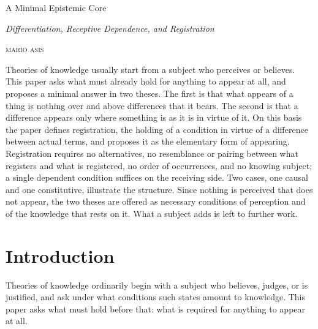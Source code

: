\documentclass[11pt,a4paper,oneside]{scrartcl}
\begin{document}
\thispagestyle{plain.scrheadings}
\begin{center}
  \vspace*{.2\baselineskip}
  {\LARGE A Minimal Epistemic Core\par}
  \vspace{.7\baselineskip}
  {\large\itshape Differentiation, Receptive Dependence, and Registration\par}
  \vspace{1.6\baselineskip}
  {\scshape \MakeLowercase{Mario Asis}\par}
  \vspace{1.8\baselineskip}
\end{center}

\begin{center}
\begin{minipage}{24pc}
  \small
  \enspace
  Theories of knowledge usually start from a subject who perceives or believes. This paper asks
  what must already hold for anything to appear at all, and proposes a minimal answer in two theses.
  The first is that what appears of a thing is nothing over and above differences that it bears.
  The second is that a difference appears only where something is as it is in virtue of it. On this
  basis the paper defines registration, the holding of a condition in virtue of a difference between
  actual terms, and proposes it as the elementary form of appearing. Registration requires no
  alternatives, no resemblance or pairing between what registers and what is registered, no order
  of occurrences, and no knowing subject; a single dependent condition suffices on the receiving
  side. Two cases, one causal and one constitutive, illustrate the structure. Since nothing is
  perceived that does not appear, the two theses are offered as necessary conditions of perception
  and of the knowledge that rests on it. What a subject adds is left to further work.
\end{minipage}
\end{center}
\vspace{1.2\baselineskip}

\section{Introduction}\label{sec:intro}

Theories of knowledge ordinarily begin with a subject who believes, judges, or is justified, and ask
under what conditions such states amount to knowledge. This paper asks what must hold before that:
what is required for anything to appear at all.
\end{document}
